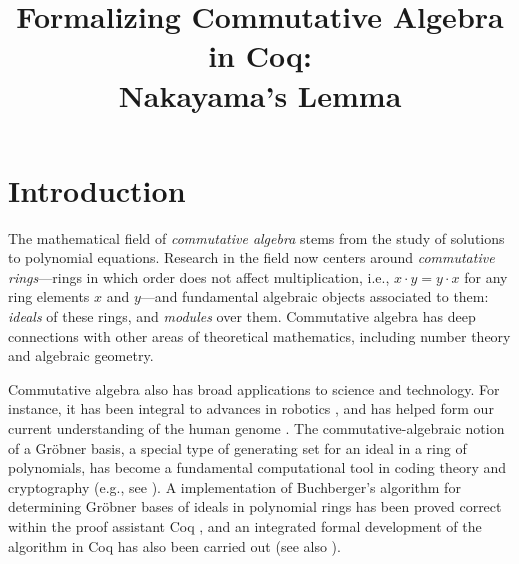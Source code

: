 \documentclass[referee,sn-mathphys]{sn-jnl}
\theoremstyle{definition}
\theoremstyle{remark}
\numberwithin{equation}{section}
\numberwithin{figure}{subsection}
\begin{document}
\title[Formalizing Commutative Algebra in Coq]{ 
Formalizing Commutative Algebra in Coq: \\
Nakayama's Lemma
}

\author[1]{ }
\author[1]{}
\author[1]{ }



\maketitle	

\section{Introduction}
The mathematical field of \emph{commutative algebra} stems from the study of
solutions to polynomial equations. Research in the field now centers around
\emph{commutative rings}---rings in which order does not affect multiplication,
i.e., $x \cdot y = y \cdot x$ for any ring elements $x$ and $y$---and
fundamental algebraic objects associated to them:  \emph{ideals} of these
rings, and \emph{modules} over them. Commutative algebra has deep connections
with other areas of theoretical mathematics, including number theory and
algebraic geometry. 

Commutative algebra also has broad applications to science and technology. For
instance, it has been integral to advances in robotics \cite{cox-little-oshea},
and has helped form our current understanding of the human genome
\cite{genetic-algebra}. The commutative-algebraic notion of a Gr\"{o}bner
basis, a special type of generating set for an ideal in a ring of polynomials,
has become a fundamental computational tool in coding theory and cryptography
(e.g., see  \cite{grobner-bases-cryptography}). A implementation of
Buchberger's algorithm \cite{buchberger} for determining Gr\"{o}bner bases of
ideals in polynomial rings has been proved correct within the proof assistant
Coq \cite{the_coq_development_team_2019_3476303,thery-buchberger}, and an
integrated formal development of the algorithm in Coq has also been carried out
\cite{persson2001integrated} (see also \cite{grobner-type-theory}). 
\end{document}
